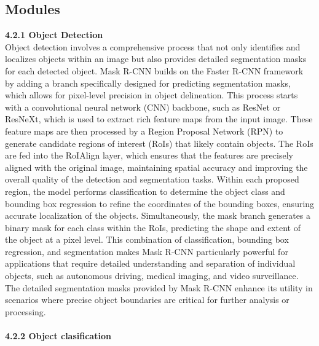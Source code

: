 \documentclass[12pt, English]{article}
\begin{document}
\subsection{Modules}
\textbf{ 4.2.1 Object Detection}\\
Object detection involves a comprehensive process that not only identifies and localizes objects within an image but also provides detailed segmentation masks for each detected object. Mask R-CNN builds on the Faster R-CNN framework by adding a branch specifically designed for predicting segmentation masks, which allows for pixel-level precision in object delineation. This process starts with a convolutional neural network (CNN) backbone, such as ResNet or ResNeXt, which is used to extract rich feature maps from the input image. These feature maps are then processed by a Region Proposal Network (RPN) to generate candidate regions of interest (RoIs) that likely contain objects. The RoIs are fed into the RoIAlign layer, which ensures that the features are precisely aligned with the original image, maintaining spatial accuracy and improving the overall quality of the detection and segmentation tasks. Within each proposed region, the model performs classification to determine the object class and bounding box regression to refine the coordinates of the bounding boxes, ensuring accurate localization of the objects. Simultaneously, the mask branch generates a binary mask for each class within the RoIs, predicting the shape and extent of the object at a pixel level. This combination of classification, bounding box regression, and segmentation makes Mask R-CNN particularly powerful for applications that require detailed understanding and separation of individual objects, such as autonomous driving, medical imaging, and video surveillance. The detailed segmentation masks provided by Mask R-CNN enhance its utility in scenarios where precise object boundaries are critical for further analysis or processing.\\
\\
\textbf{4.2.2 Object clasification}\\
\end{document}
